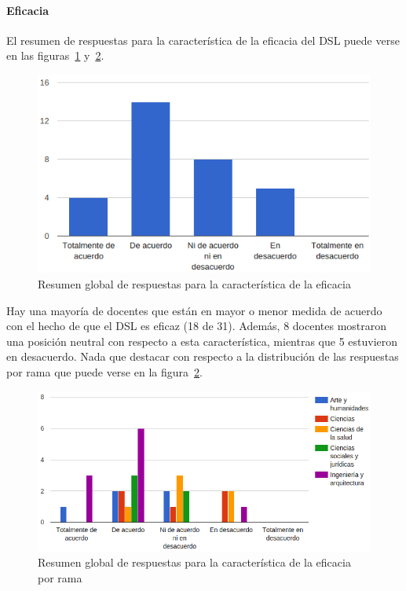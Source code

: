 \newpage
\paragraph*{Eficacia}

El resumen de respuestas para la característica de la eficacia del DSL puede verse en las figuras~\ref{fig:evalmetodo:dsl:eficacia} y~\ref{fig:evalmetodo:dsl:eficacia:rama}.

\begin{figure}[h]
  \begin{center}
    \includegraphics[scale=0.45]{C_DSL_eficacia.png}
  \end{center}
  \caption{Resumen global de respuestas para la característica de la eficacia}
  \label{fig:evalmetodo:dsl:eficacia}
\end{figure}

Hay una mayoría de docentes que están en mayor o menor medida de acuerdo con el hecho de que el DSL es eficaz (18 de 31). Además, 8 docentes mostraron una posición neutral con respecto a esta característica, mientras que 5 estuvieron en desacuerdo. Nada que destacar con respecto a la distribución de las respuestas por rama que puede verse en la figura~\ref{fig:evalmetodo:dsl:eficacia:rama}.

\begin{figure}[h]
  \begin{center}
    \includegraphics[scale=0.5]{C_DSL_eficacia_rama.png}
  \end{center}
  \caption{Resumen global de respuestas para la característica de la eficacia por rama}
  \label{fig:evalmetodo:dsl:eficacia:rama}
\end{figure}

